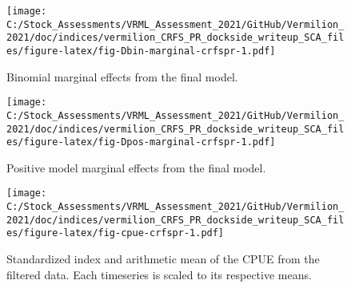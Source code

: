 \documentclass[
]{article}
\begin{document}
\begin{figure}
\centering
\texttt{[image: C:/Stock\_Assessments/VRML\_Assessment\_2021/GitHub/Vermilion\_2021/doc/indices/vermilion\_CRFS\_PR\_dockside\_writeup\_SCA\_files/figure-latex/fig-Dbin-marginal-crfspr-1.pdf]}
\caption{\label{fig:fig-Dbin-marginal-crfspr}Binomial marginal effects from the final model.}
\end{figure}

\begin{figure}
\centering
\texttt{[image: C:/Stock\_Assessments/VRML\_Assessment\_2021/GitHub/Vermilion\_2021/doc/indices/vermilion\_CRFS\_PR\_dockside\_writeup\_SCA\_files/figure-latex/fig-Dpos-marginal-crfspr-1.pdf]}
\caption{\label{fig:fig-Dpos-marginal-crfspr}Positive model marginal effects from the final model.}
\end{figure}

\begin{figure}
\centering
\texttt{[image: C:/Stock\_Assessments/VRML\_Assessment\_2021/GitHub/Vermilion\_2021/doc/indices/vermilion\_CRFS\_PR\_dockside\_writeup\_SCA\_files/figure-latex/fig-cpue-crfspr-1.pdf]}
\caption{\label{fig:fig-cpue-crfspr}Standardized index and arithmetic mean of the CPUE from the filtered data. Each timeseries is scaled to its respective means.}
\end{figure}
\end{document}
